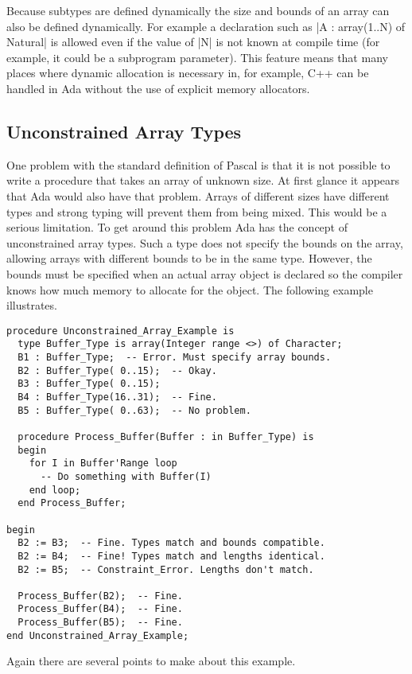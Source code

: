 Because subtypes are defined dynamically the size and bounds of an array can also be defined
dynamically. For example a declaration such as |A : array(1..N) of Natural| is allowed even if
the value of |N| is not known at compile time (for example, it could be a subprogram parameter).
This feature means that many places where dynamic allocation is necessary in, for example, C++
can be handled in Ada without the use of explicit memory allocators.

\subsection{Unconstrained Array Types}

One problem with the standard definition of Pascal is that it is not possible to write a
procedure that takes an array of unknown size. At first glance it appears that Ada would also
have that problem. Arrays of different sizes have different types and strong typing will prevent
them from being mixed. This would be a serious limitation. To get around this problem Ada has
the concept of unconstrained array types. Such a type does not specify the bounds on the array,
allowing arrays with different bounds to be in the same type. However, the bounds must be
specified when an actual array object is declared so the compiler knows how much memory to
allocate for the object. The following example illustrates.

\begin{lstlisting}
procedure Unconstrained_Array_Example is
  type Buffer_Type is array(Integer range <>) of Character;
  B1 : Buffer_Type;  -- Error. Must specify array bounds.
  B2 : Buffer_Type( 0..15);  -- Okay.
  B3 : Buffer_Type( 0..15);
  B4 : Buffer_Type(16..31);  -- Fine.
  B5 : Buffer_Type( 0..63);  -- No problem.

  procedure Process_Buffer(Buffer : in Buffer_Type) is
  begin
    for I in Buffer'Range loop
      -- Do something with Buffer(I)
    end loop;
  end Process_Buffer;

begin
  B2 := B3;  -- Fine. Types match and bounds compatible.
  B2 := B4;  -- Fine! Types match and lengths identical.
  B2 := B5;  -- Constraint_Error. Lengths don't match.

  Process_Buffer(B2);  -- Fine.
  Process_Buffer(B4);  -- Fine.
  Process_Buffer(B5);  -- Fine.
end Unconstrained_Array_Example;
\end{lstlisting}

Again there are several points to make about this example.

